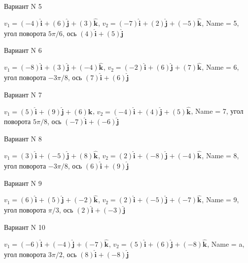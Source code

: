 \documentclass[11pt]{report}
\begin{document}
Вариант N 5

$v_1 = \left(-4\right)\mathbf{\hat{i}_{}} + \left(6\right)\mathbf{\hat{j}_{}} + \left(3\right)\mathbf{\hat{k}_{}}$, $v_2 = \left(-7\right)\mathbf{\hat{i}_{}} + \left(2\right)\mathbf{\hat{j}_{}} + \left(-5\right)\mathbf{\hat{k}_{}}$, Name = 5, угол поворота $5 \pi / 6$, ось $\left(4\right)\mathbf{\hat{i}_{}} + \left(5\right)\mathbf{\hat{j}_{}}$

Вариант N 6

$v_1 = \left(-8\right)\mathbf{\hat{i}_{}} + \left(3\right)\mathbf{\hat{j}_{}} + \left(-4\right)\mathbf{\hat{k}_{}}$, $v_2 = \left(-2\right)\mathbf{\hat{i}_{}} + \left(6\right)\mathbf{\hat{j}_{}} + \left(7\right)\mathbf{\hat{k}_{}}$, Name = 6, угол поворота $- 3 \pi / 8$, ось $\left(7\right)\mathbf{\hat{i}_{}} + \left(6\right)\mathbf{\hat{j}_{}}$

Вариант N 7

$v_1 = \left(5\right)\mathbf{\hat{i}_{}} + \left(9\right)\mathbf{\hat{j}_{}} + \left(6\right)\mathbf{\hat{k}_{}}$, $v_2 = \left(-4\right)\mathbf{\hat{i}_{}} + \left(4\right)\mathbf{\hat{j}_{}} + \left(5\right)\mathbf{\hat{k}_{}}$, Name = 7, угол поворота $5 \pi / 8$, ось $\left(-7\right)\mathbf{\hat{i}_{}} + \left(-6\right)\mathbf{\hat{j}_{}}$

Вариант N 8

$v_1 = \left(3\right)\mathbf{\hat{i}_{}} + \left(-5\right)\mathbf{\hat{j}_{}} + \left(8\right)\mathbf{\hat{k}_{}}$, $v_2 = \left(2\right)\mathbf{\hat{i}_{}} + \left(-8\right)\mathbf{\hat{j}_{}} + \left(-4\right)\mathbf{\hat{k}_{}}$, Name = 8, угол поворота $- 3 \pi / 8$, ось $\left(6\right)\mathbf{\hat{i}_{}} + \left(9\right)\mathbf{\hat{j}_{}}$

Вариант N 9

$v_1 = \left(6\right)\mathbf{\hat{i}_{}} + \left(5\right)\mathbf{\hat{j}_{}} + \left(-2\right)\mathbf{\hat{k}_{}}$, $v_2 = \left(2\right)\mathbf{\hat{i}_{}} + \left(-5\right)\mathbf{\hat{j}_{}} + \left(-7\right)\mathbf{\hat{k}_{}}$, Name = 9, угол поворота $\pi / 3$, ось $\left(2\right)\mathbf{\hat{i}_{}} + \left(-3\right)\mathbf{\hat{j}_{}}$

Вариант N 10

$v_1 = \left(-6\right)\mathbf{\hat{i}_{}} + \left(-4\right)\mathbf{\hat{j}_{}} + \left(-7\right)\mathbf{\hat{k}_{}}$, $v_2 = \left(5\right)\mathbf{\hat{i}_{}} + \left(6\right)\mathbf{\hat{j}_{}} + \left(-8\right)\mathbf{\hat{k}_{}}$, Name = a, угол поворота $3 \pi / 2$, ось $\left(8\right)\mathbf{\hat{i}_{}} + \left(-8\right)\mathbf{\hat{j}_{}}$
\end{document}
